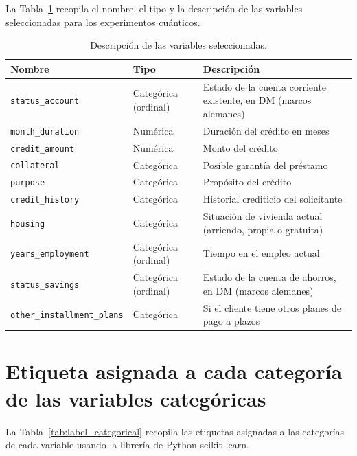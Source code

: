 \documentclass{ieeeaccess}
\begin{document}
La Tabla~\ref{tab:variables_descriptions} recopila el nombre, el tipo y la descripción de las variables seleccionadas para los experimentos cuánticos.

\begin{table}[!t]
  \caption{Descripción de las variables seleccionadas.}
  \label{tab:variables_descriptions}
  \centering
  \begin{tabular}{llp{}}
    \toprule
    Nombre & Tipo & Descripción \\
    \midrule
    \texttt{status\_account}           & Categórica (ordinal)     & Estado de la cuenta corriente existente, en DM (marcos alemanes) \\
    \texttt{month\_duration}           & Numérica   & Duración del crédito en meses \\
    \texttt{credit\_amount}            & Numérica   & Monto del crédito \\
    \texttt{collateral}                & Categórica & Posible garantía del préstamo \\
    \texttt{purpose}                   & Categórica & Propósito del crédito \\
    \texttt{credit\_history}           & Categórica & Historial crediticio del solicitante \\
    \texttt{housing}                   & Categórica & Situación de vivienda actual (arriendo, propia o gratuita) \\
    \texttt{years\_employment}         & Categórica (ordinal)     & Tiempo en el empleo actual \\
    \texttt{status\_savings}           & Categórica (ordinal)     & Estado de la cuenta de ahorros, en DM (marcos alemanes) \\
    \texttt{other\_installment\_plans} & Categórica & Si el cliente tiene otros planes de pago a plazos \\
    \bottomrule
  \end{tabular}
\end{table}

\section{Etiqueta asignada a cada categoría de las variables categóricas}
\label{ap:label_categorical}

La Tabla~\ref{tab:label_categorical} recopila las etiquetas asignadas a las categorías de cada variable usando la librería de Python scikit-learn.
\end{document}
